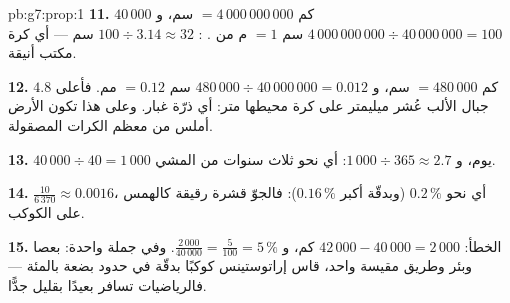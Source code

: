 \begin{solution}{pb:g7:prop:1}
\textbf{11.} $40\,000$ كم $= 4\,000\,000\,000$ سم، و
$4\,000\,000\,000 \div 40\,000\,000 = 100$ سم $= 1$ م من
. : $100 \div 3.14 \approx 32$ سم --- أي
كرة مكتب أنيقة.

\textbf{12.} $4.8$ كم $= 480\,000$ سم، و
$480\,000 \div 40\,000\,000 = 0.012$ سم $= 0.12$ مم. فأعلى
جبال الألب عُشر ميليمتر على كرة
محيطها متر: أي ذرّة غبار. وعلى هذا  تكون الأرض
أملس من معظم الكرات المصقولة.

\textbf{13.} $40\,000 \div 40 = 1\,000$ يوم، و
$1\,000 \div 365 \approx 2.7$: أي نحو ثلاث سنوات من المشي.

\textbf{14.} $\frac{10}{6\,370} \approx 0.0016$، أي نحو
$0.2\,\%$ (وبدقّة أكبر $0.16\,\%$): فالجوّ قشرة
رقيقة كالهمس على الكوكب.

\textbf{15.} الخطأ: $42\,000 - 40\,000 = 2\,000$ كم، و
$\frac{2\,000}{40\,000} = \frac{5}{100} = 5\,\%$. وفي جملة واحدة:
بعصا وبئر وطريق مقيسة  واحد،
قاس إراتوستينس كوكبًا بدقّة في حدود بضعة بالمئة ---
فالرياضيات تسافر بعيدًا بقليل جدًّا.
\end{solution}
